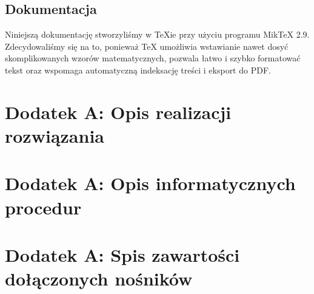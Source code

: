 \documentclass[11pt,a4paper]{article}
\begin{document}
\subsection{Dokumentacja}
Niniejszą dokumentację stworzyliśmy w TeXie przy użyciu programu MikTeX 2.9. Zdecydowaliśmy się na to, ponieważ TeX umożliwia wstawianie nawet dosyć skomplikowanych wzorów matematycznych, pozwala łatwo i szybko formatować tekst oraz wspomaga automatyczną indeksację treści i eksport do PDF.  \\
\indent

\section{Dodatek A: Opis realizacji rozwiązania}
\section{Dodatek A: Opis informatycznych procedur}
\section{Dodatek A: Spis zawartości dołączonych nośników}
\end{document}
